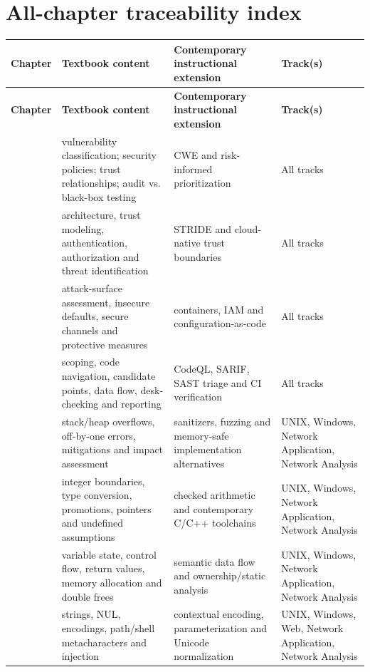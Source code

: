 \documentclass[10pt,letterpaper]{article}
\begin{document}
\section{All-chapter traceability index}
\begingroup\footnotesize\setlength\tabcolsep{3pt}
\begin{longtable}{>{\raggedright\arraybackslash}p{}>{\raggedright\arraybackslash}p{}>{\raggedright\arraybackslash}p{}>{\raggedright\arraybackslash}p{}}\toprule
\textbf{Chapter} & \textbf{Textbook content} & \textbf{Contemporary instructional extension} & \textbf{Track(s)}\\\midrule\endfirsthead
\toprule \textbf{Chapter} & \textbf{Textbook content} & \textbf{Contemporary instructional extension} & \textbf{Track(s)}\\\midrule\endhead
1 & vulnerability classification; security policies; trust relationships; audit vs. black-box testing & CWE and risk-informed prioritization & All tracks\\\midrule
2 & architecture, trust modeling, authentication, authorization and threat identification & STRIDE and cloud-native trust boundaries & All tracks\\\midrule
3 & attack-surface assessment, insecure defaults, secure channels and protective measures & containers, IAM and configuration-as-code & All tracks\\\midrule
4 & scoping, code navigation, candidate points, data flow, desk-checking and reporting & CodeQL, SARIF, SAST triage and CI verification & All tracks\\\midrule
5 & stack/heap overflows, off-by-one errors, mitigations and impact assessment & sanitizers, fuzzing and memory-safe implementation alternatives & UNIX, Windows, Network Application, Network Analysis\\\midrule
6 & integer boundaries, type conversion, promotions, pointers and undefined assumptions & checked arithmetic and contemporary C/C++ toolchains & UNIX, Windows, Network Application, Network Analysis\\\midrule
7 & variable state, control flow, return values, memory allocation and double frees & semantic data flow and ownership/static analysis & UNIX, Windows, Network Application, Network Analysis\\\midrule
8 & strings, NUL, encodings, path/shell metacharacters and injection & contextual encoding, parameterization and Unicode normalization & UNIX, Windows, Web, Network Application, Network Analysis\\\midrule

\end{longtable}
\end{document}
